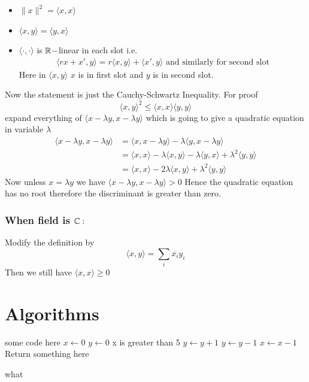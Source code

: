 \documentclass{report}
\begin{document}
{	\begin{note}
		\begin{itemize}
			\item $\|x\|^2=\langle x,x\rangle$
			\item $\langle x,y\rangle=\langle y,x\rangle$
			\item $\langle \cdot,\cdot\rangle$ is $\mathbb{R}-$linear in each slot i.e. \begin{align*}
				      \langle rx+x',y\rangle=r\langle x,y\rangle+\langle x',y\rangle	\text{ and similarly for second slot}
			      \end{align*}Here in $\langle x,y\rangle$ $x$ is in first slot and $y$ is in second slot.
		\end{itemize}
	\end{note}Now the statement is just the Cauchy-Schwartz Inequality. For proof $$\langle x,y\rangle^2\leq \langle x,x\rangle\langle y,y\rangle $$ expand everything of $\langle x-\lambda y,x-\lambda y\rangle$ which is going to give a quadratic equation in variable $\lambda $ \begin{align*}
		\langle x-\lambda y,x-\lambda y\rangle & =\langle x,x-\lambda y\rangle-\lambda\langle y,x-\lambda y\rangle                                       \\
		                                       & =\langle x ,x\rangle -\lambda\langle x,y\rangle -\lambda\langle y,x\rangle +\lambda^2\langle y,y\rangle \\
		                                       & =\langle x,x\rangle -2\lambda\langle x,y\rangle+\lambda^2\langle y,y\rangle
	\end{align*}Now unless $x=\lambda y$ we have $\langle x-\lambda y,x-\lambda y\rangle>0$ Hence the quadratic equation has no root therefore the discriminant is greater than zero.

	\subsubsection*{\textbf{When field is $\mathbb{C}:$}}Modify the definition by $$\langle x,y\rangle=\sum_i\overline{x_i}y_i$$Then we still have $\langle x,x\rangle\geq 0$}

\section{Algorithms}
\begin{algorithm}[H]
\SetAlgoLined
\SetNoFillComment
{}
\vspace{3mm}
some code here\;
$x \leftarrow 0$\;
$y \leftarrow 0$\;
 {
    x is greater than 5 
}
 {
    $y \leftarrow y + 1$\;
}
 {
    $y \leftarrow y - 1$\;
}
 {
    $x \leftarrow x - 1$\;
}
\Return Return something here\;
\caption{what}
\end{algorithm}
\end{document}
